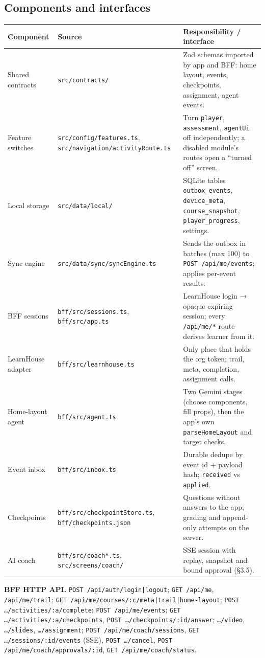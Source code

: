\documentclass[11pt,a4paper]{article}
\newcommand{\fp}[1]{\nolinkurl{#1}}
\begin{document}
\subsection{Components and interfaces}
\begin{xltabular}{\textwidth}{L{0.21\textwidth}L{0.29\textwidth}Y}
\toprule
\textbf{Component} & \textbf{Source} & \textbf{Responsibility / interface} \\
\midrule
Shared contracts & \fp{src/contracts/} & Zod schemas imported by app and BFF: home layout, events, checkpoints, assignment, agent events. \\
Feature switches & \fp{src/config/features.ts}, \fp{src/navigation/activityRoute.ts} & Turn \texttt{player}, \texttt{assessment}, \texttt{agentUi} off independently; a disabled module's routes open a ``turned off'' screen. \\
Local storage & \fp{src/data/local/} & SQLite tables \texttt{outbox\_events}, \texttt{device\_meta}, \texttt{course\_snapshot}, \texttt{player\_progress}, settings. \\
Sync engine & \fp{src/data/sync/syncEngine.ts} & Sends the outbox in batches (max 100) to \texttt{POST /api/me/events}; applies per-event results. \\
BFF sessions & \fp{bff/src/sessions.ts}, \fp{bff/src/app.ts} & LearnHouse login → opaque expiring session; every \texttt{/api/me/*} route derives learner from it. \\
LearnHouse adapter & \fp{bff/src/learnhouse.ts} & Only place that holds the org token; trail, meta, completion, assignment calls. \\
Home-layout agent & \fp{bff/src/agent.ts} & Two Gemini stages (choose components, fill props), then the app's own \texttt{parseHomeLayout} and target checks. \\
Event inbox & \fp{bff/src/inbox.ts} & Durable dedupe by event id + payload hash; \texttt{received} vs \texttt{applied}. \\
Checkpoints & \fp{bff/src/checkpointStore.ts}, \fp{bff/checkpoints.json} & Questions without answers to the app; grading and append-only attempts on the server. \\
AI coach & \fp{bff/src/coach*.ts}, \fp{src/screens/coach/} & SSE session with replay, snapshot and bound approval (§3.5). \\
\bottomrule
\end{xltabular}

\textbf{BFF HTTP API.} \texttt{POST /api/auth/login|logout}; \texttt{GET /api/me}, \texttt{/api/me/trail};
\texttt{GET /api/me/courses/:c/meta|trail|home-layout}; \texttt{POST …/activities/:a/complete};
\texttt{POST /api/me/events}; \texttt{GET …/activities/:a/checkpoints}, \texttt{POST …/checkpoints/:id/answer};
\texttt{…/video}, \texttt{…/slides}, \texttt{…/assignment}; \texttt{POST /api/me/coach/sessions},
\texttt{GET …/sessions/:id/events} (SSE), \texttt{POST …/cancel}, \texttt{POST /api/me/coach/approvals/:id},
\texttt{GET /api/me/coach/status}.
\end{document}
